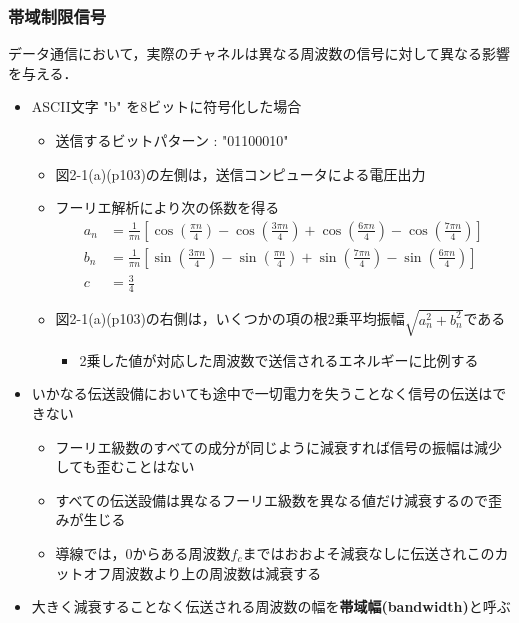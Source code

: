 \documentclass[a4paper]{ltjsarticle}
\begin{document}
		\subsubsection{帯域制限信号}
			データ通信において，実際のチャネルは異なる周波数の信号に対して異なる影響を与える．
			\begin{itemize}
				\item ASCII文字 "b" を8ビットに符号化した場合
				\begin{itemize}
					\item 送信するビットパターン : "01100010"
					\item 図2-1(a)(p103)の左側は，送信コンピュータによる電圧出力
					\item フーリエ解析により次の係数を得る
						\begin{align}
							a_n &= \frac{1}{\pi n}\left[\cos\left(\frac{\pi n}{4}\right) - \cos\left(\frac{3\pi n}{4}\right) + \cos\left( \frac{6\pi n}{4}\right) - \cos\left(\frac{7\pi n}{4} \right) \right] \\
							b_n &= \frac{1}{\pi n}\left[\sin\left(\frac{3\pi n}{4}\right) - \sin\left(\frac{\pi n}{4}\right) + \sin\left( \frac{7\pi n}{4}\right) - \sin\left(\frac{6\pi n}{4} \right) \right] \\
							c &= \frac{3}{4}
						\end{align}
					\item 図2-1(a)(p103)の右側は，いくつかの項の根2乗平均振幅$\sqrt{a^2_n + b^2_n}$である
					\begin{itemize}
						\item 2乗した値が対応した周波数で送信されるエネルギーに比例する
					\end{itemize}
				\end{itemize}
				\item いかなる伝送設備においても途中で一切電力を失うことなく信号の伝送はできない
				\begin{itemize}
					\item フーリエ級数のすべての成分が同じように減衰すれば信号の振幅は減少しても歪むことはない
					\item すべての伝送設備は異なるフーリエ級数を異なる値だけ減衰するので歪みが生じる
					\item 導線では，0からある周波数$f_c$まではおおよそ減衰なしに伝送されこのカットオフ周波数より上の周波数は減衰する
				\end{itemize}
				\item 大きく減衰することなく伝送される周波数の幅を\textbf{帯域幅(bandwidth)}と呼ぶ
				\begin{itemize}

\end{itemize}
\end{itemize}
\end{document}
